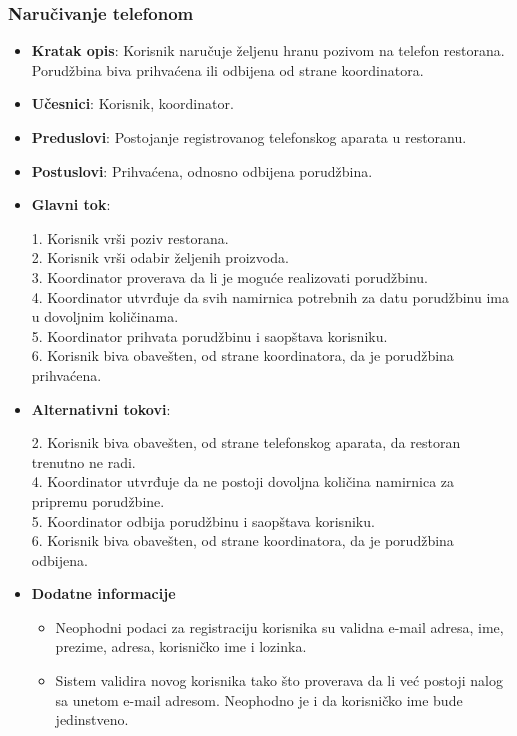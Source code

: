 \subsubsection{Naručivanje telefonom}
\begin{itemize}
    \item \textbf{Kratak opis}: Korisnik naručuje željenu hranu pozivom na telefon restorana. Porudžbina biva prihvaćena ili odbijena od strane koordinatora.
    \item \textbf{Učesnici}: Korisnik, koordinator.
    \item \textbf{Preduslovi}: Postojanje registrovanog telefonskog aparata u restoranu.
    \item \textbf{Postuslovi}: Prihvaćena, odnosno odbijena porudžbina.
     \item \textbf{Glavni tok}:
    
    1. Korisnik vrši poziv restorana.\\
    2. Korisnik vrši odabir željenih proizvoda.\\
    3. Koordinator proverava da li je moguće realizovati porudžbinu.\\
    4. Koordinator utvrđuje da svih namirnica potrebnih za datu porudžbinu ima u dovoljnim količinama.\\
    5. Koordinator prihvata porudžbinu i saopštava korisniku.\\
    6. Korisnik biva obavešten, od strane koordinatora, da je porudžbina prihvaćena.
    
    \item \textbf{Alternativni tokovi}:
     
     2. Korisnik biva obavešten, od strane telefonskog aparata, da restoran trenutno ne radi.\\
     4. Koordinator utvrđuje da ne postoji dovoljna količina namirnica za pripremu porudžbine.\\
     5. Koordinator odbija porudžbinu i saopštava korisniku.\\
     6. Korisnik biva obavešten, od strane koordinatora, da je porudžbina odbijena.
    
     
\end{itemize}

 \begin{itemize} 
     \item \textbf{Dodatne informacije}
 \begin{itemize}
     \item Neophodni podaci za registraciju korisnika su validna e-mail adresa, ime, prezime, adresa, korisničko ime i lozinka.
    \item Sistem validira novog korisnika tako što proverava da li već postoji nalog sa unetom e-mail adresom. Neophodno je i da korisničko ime bude jedinstveno.
 \end{itemize}
 \end{itemize}
 


